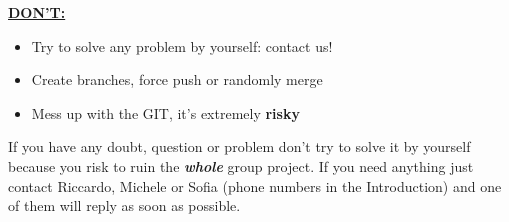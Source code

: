 \documentclass[a4paper,12pt]{article}
\newcommand{\<}{\textless}
\renewcommand{\>}{\textgreater}
\begin{document}
\textbf{\underline{DON'T:}}
\begin{itemize}
 \item Try to solve any problem by yourself: contact us!
 \item Create branches, force push or randomly merge
 \item Mess up with the GIT, it's extremely \textbf{risky}
\end{itemize}


If you have any doubt, question or problem don't try to solve it by yourself because you risk to ruin the \textbf{\textit{whole}} group project. If you need anything just contact Riccardo, Michele or Sofia (phone numbers in the Introduction) and one of them will reply as soon as possible.
\end{document}
